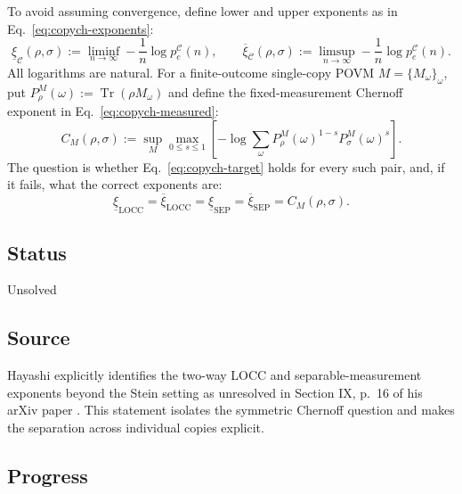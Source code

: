 To avoid assuming convergence, define lower and upper exponents as in Eq.~\eqref{eq:copych-exponents}:
\begin{equation}
\underline\xi_{\mathcal C}(\rho,\sigma):=\liminf_{n\to\infty}-\frac1n\log p_e^{\mathcal C}(n),
\qquad
\overline\xi_{\mathcal C}(\rho,\sigma):=\limsup_{n\to\infty}-\frac1n\log p_e^{\mathcal C}(n).
\label{eq:copych-exponents}
\end{equation}
All logarithms are natural. For a finite-outcome single-copy POVM $M=\{M_\omega\}_\omega$, put $P^M_\rho(\omega):=\operatorname{Tr}(\rho M_\omega)$ and define the fixed-measurement Chernoff exponent in Eq.~\eqref{eq:copych-measured}:
\begin{equation}
C_M(\rho,\sigma):=\sup_M\max_{0\leq s\leq1}\left[-\log\sum_\omega P^M_\rho(\omega)^{1-s}P^M_\sigma(\omega)^s\right].
\label{eq:copych-measured}
\end{equation}
The question is whether Eq.~\eqref{eq:copych-target} holds for every such pair, and, if it fails, what the correct exponents are:
\begin{equation}
\underline\xi_{\mathrm{LOCC}}=\overline\xi_{\mathrm{LOCC}}
=\underline\xi_{\mathrm{SEP}}=\overline\xi_{\mathrm{SEP}}
=C_M(\rho,\sigma).
\label{eq:copych-target}
\end{equation}

\subsection*{Status}

Unsolved

\subsection*{Source}

Hayashi explicitly identifies the two-way LOCC and separable-measurement exponents beyond the Stein setting as unresolved in Section IX, p.~16 of his arXiv paper . This statement isolates the symmetric Chernoff question and makes the separation across individual copies explicit.

\subsection*{Progress}

